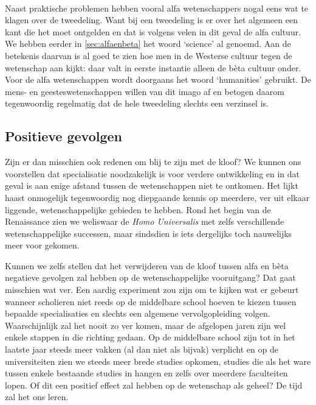 \paragraph{}

Naast praktische problemen hebben vooral alfa wetenschappers nogal eens wat te klagen over de tweedeling. Want bij een tweedeling is er over het algemeen een kant die het moet ontgelden en dat is volgens velen in dit geval de alfa cultuur. We hebben eerder in \ref{sec:alfaenbeta} het woord `science' al genoemd. Aan de betekenis daarvan is al goed te zien hoe men in de Westerse cultuur tegen de wetenschap aan kijkt: daar valt in eerste instantie alleen de b\`eta cultuur onder. Voor de alfa wetenschappen wordt doorgaans het woord `humanities' gebruikt. De mens- en geesteswetenschappen willen van dit imago af en betogen daarom tegenwoordig regelmatig dat de hele tweedeling slechts een verzinsel is.


\subsection{Positieve gevolgen}

Zijn er dan misschien ook redenen om blij te zijn met de kloof? We kunnen ons voorstellen dat specialisatie noodzakelijk is voor verdere ontwikkeling en in dat geval is aan enige afstand tussen de wetenschappen niet te ontkomen. Het lijkt haast onmogelijk tegenwoordig nog diepgaande kennis op meerdere, ver uit elkaar liggende, wetenschappelijke gebieden te hebben. Rond het begin van de Renaissance zien we weliswaar de \emph{Homo Universalis} met zelfs verschillende wetenschappelijke successen, maar sindsdien is iets dergelijks toch nauwelijks meer voor gekomen.

Kunnen we zelfs stellen dat het verwijderen van de kloof tussen alfa en b\`eta negatieve gevolgen zal hebben op de wetenschappelijke vooruitgang? Dat gaat misschien wat ver. Een aardig experiment zou zijn om te kijken wat er gebeurt wanneer scholieren niet reeds op de middelbare school hoeven te kiezen tussen bepaalde specialisaties en slechts een algemene vervolgopleiding volgen. Waarschijnlijk zal het nooit zo ver komen, maar de afgelopen jaren zijn wel enkele stappen in die richting gedaan. Op de middelbare school zijn tot in het laatste jaar steeds meer vakken (al dan niet als bijvak) verplicht en op de universiteiten zien we steeds meer brede studies opkomen, studies die als het ware tussen enkele bestaande studies in hangen en zelfs over meerdere faculteiten lopen. Of dit een positief effect zal hebben op de wetenschap als geheel? De tijd zal het ons leren.



